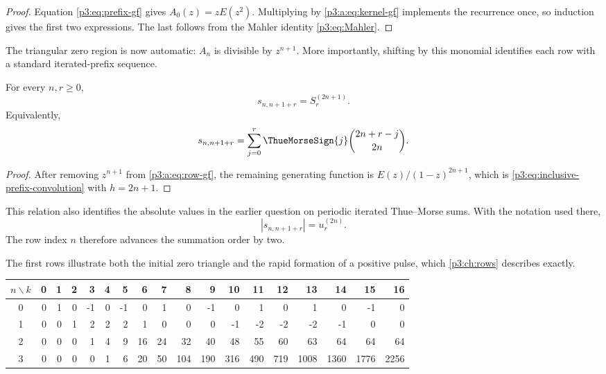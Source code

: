 \documentclass[11pt,oneside]{article}
\numberwithin{equation}{section}
\theoremstyle{definition}
\theoremstyle{remark}
\begin{document}
\begin{proof}
Equation \eqref{p3:eq:prefix-gf} gives \(A_0(z)=zE(z^2)\).  Multiplying by
\eqref{p3:a:eq:kernel-gf} implements the recurrence once, so induction gives the
first two expressions.  The last follows from the Mahler identity
\eqref{p3:eq:Mahler}.
\end{proof}

The triangular zero region is now automatic: \(A_n\) is divisible by
\(z^{n+1}\).  More importantly, shifting by this monomial identifies each row
with a standard iterated-prefix sequence.

\begin{corollary}
For every \(n,r\ge0\),
\begin{equation}
 \boxed{s_{n,n+1+r}=S_r^{(2n+1)}.}
 \label{p3:a:eq:row-prefix-identification}
\end{equation}
Equivalently,
\begin{equation}
 s_{n,n+1+r}
 =\sum_{j=0}^{r}\ThueMorseSign{j}\binom{2n+r-j}{2n}.
 \label{p3:a:eq:row-prefix-convolution}
\end{equation}
\end{corollary}

\begin{proof}
After removing \(z^{n+1}\) from \eqref{p3:a:eq:row-gf}, the remaining generating
function is \(E(z)/(1-z)^{2n+1}\), which is
\eqref{p3:eq:inclusive-prefix-convolution} with \(h=2n+1\).
\end{proof}

This relation also identifies the absolute values in the earlier question on
periodic iterated Thue--Morse sums.  With the notation used there,
\begin{equation}
 |s_{n,n+1+r}|=u_r^{(2n)}.
 \label{p3:a:eq:mathse-map}
\end{equation}
The row index \(n\) therefore advances the summation order by two.

The first rows illustrate both the initial zero triangle and the rapid
formation of a positive pulse, which \cref{p3:ch:rows} describes exactly.

\begin{center}
\small
\setlength{\tabcolsep}{3.6pt}
\begin{tabular}{c|rrrrrrrrrrrrrrrrr}
\toprule
\(n\backslash k\)&0&1&2&3&4&5&6&7&8&9&10&11&12&13&14&15&16\\
\midrule
0&0&1&0&-1&0&-1&0&1&0&-1&0&1&0&1&0&-1&0\\
1&0&0&1&2&2&2&1&0&0&0&-1&-2&-2&-2&-1&0&0\\
2&0&0&0&1&4&9&16&24&32&40&48&55&60&63&64&64&64\\
3&0&0&0&0&1&6&20&50&104&190&316&490&719&1008&1360&1776&2256\\
\bottomrule
\end{tabular}
\end{center}
\end{document}
